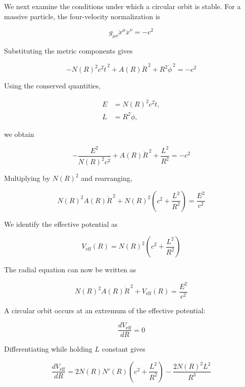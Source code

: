 \documentclass[pdflatex,sn-mathphys-num]{sn-jnl}%
\theoremstyle{thmstyleone}%
\theoremstyle{thmstyletwo}%
\theoremstyle{thmstylethree}%
\begin{document}
\begin{appendices}
We next examine the conditions under which a circular orbit is stable. For a massive particle, the four-velocity normalization is

\begin{equation}
g_{\mu\nu}\dot{x}^{\mu}\dot{x}^{\nu}=-c^2
\end{equation}

Substituting the metric components gives

\begin{equation}
-N(R)^2c^2\dot{t}^{\,2}
+
A(R)\dot{R}^{\,2}
+
R^2\dot{\phi}^{\,2}
=
-c^2
\end{equation}

Using the conserved quantities,

\begin{align}
E &= N(R)^2c^2\dot{t}, \\
L &= R^2\dot{\phi},
\end{align}

we obtain

\begin{equation}
-\frac{E^2}{N(R)^2c^2}
+
A(R)\dot{R}^{\,2}
+
\frac{L^2}{R^2}
=
-c^2
\end{equation}

Multiplying by $N(R)^2$ and rearranging,

\begin{equation}
N(R)^2A(R)\dot{R}^{\,2}
+
N(R)^2
\left(
c^2+\frac{L^2}{R^2}
\right)
=
\frac{E^2}{c^2}
\end{equation}

We identify the effective potential as

\begin{equation}
\boxed{
V_{\mathrm{eff}}(R)
=
N(R)^2
\left(
c^2+\frac{L^2}{R^2}
\right)
}
\end{equation}

The radial equation can now be written as

\begin{equation}
N(R)^2A(R)\dot{R}^{\,2}
+
V_{\mathrm{eff}}(R)
=
\frac{E^2}{c^2}
\end{equation}

A circular orbit occurs at an extremum of the effective potential:

\begin{equation}
\frac{dV_{\mathrm{eff}}}{dR}=0
\end{equation}

Differentiating while holding $L$ constant gives

\begin{equation}
\frac{dV_{\mathrm{eff}}}{dR}
=
2N(R)N'(R)
\left(
c^2+\frac{L^2}{R^2}
\right)
-
\frac{2N(R)^2L^2}{R^3}
\end{equation}


\end{appendices}
\end{document}
